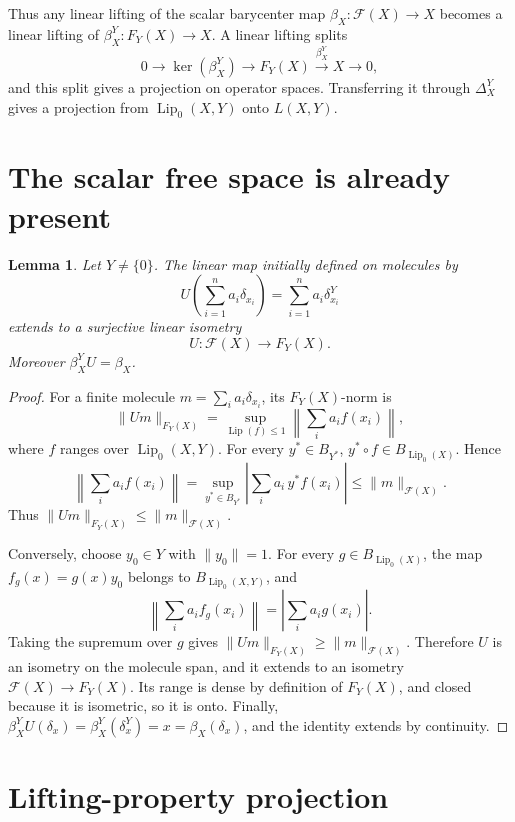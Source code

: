 \documentclass[11pt]{article}
\newtheorem{lemma}{Lemma}
\DeclareMathOperator{\Lip}{Lip}
\begin{document}
Thus any linear lifting of the scalar barycenter map
\(\beta_X:\mathcal F(X)\to X\) becomes a linear lifting of
\(\beta_X^Y:F_Y(X)\to X\). A linear lifting splits
\[
  0\longrightarrow \ker(\beta_X^Y)\longrightarrow F_Y(X)
  \stackrel{\beta_X^Y}{\longrightarrow} X\longrightarrow 0,
\]
and this split gives a projection on operator spaces. Transferring it through
\(\Delta_X^Y\) gives a projection from \(\Lip_0(X,Y)\) onto \(L(X,Y)\).

\section*{The scalar free space is already present}

\begin{lemma}
Let \(Y\neq\{0\}\). The linear map initially defined on molecules by
\[
  U\left(\sum_{i=1}^n a_i\delta_{x_i}\right)
  =
  \sum_{i=1}^n a_i\delta_{x_i}^Y
\]
extends to a surjective linear isometry
\[
  U:\mathcal F(X)\longrightarrow F_Y(X).
\]
Moreover \(\beta_X^Y U=\beta_X\).
\end{lemma}

\begin{proof}
For a finite molecule \(m=\sum_i a_i\delta_{x_i}\), its \(F_Y(X)\)-norm is
\[
  \|Um\|_{F_Y(X)}
  =
  \sup_{\Lip(f)\leq 1}
  \left\|\sum_i a_i f(x_i)\right\|,
\]
where \(f\) ranges over \(\Lip_0(X,Y)\). For every \(y^*\in B_{Y^*}\),
\(y^*\circ f\in B_{\Lip_0(X)}\). Hence
\[
  \left\|\sum_i a_i f(x_i)\right\|
  =
  \sup_{y^*\in B_{Y^*}}
  \left|\sum_i a_i\,y^*f(x_i)\right|
  \leq \|m\|_{\mathcal F(X)}.
\]
Thus \(\|Um\|_{F_Y(X)}\leq \|m\|_{\mathcal F(X)}\).

Conversely, choose \(y_0\in Y\) with \(\|y_0\|=1\). For every
\(g\in B_{\Lip_0(X)}\), the map \(f_g(x)=g(x)y_0\) belongs to
\(B_{\Lip_0(X,Y)}\), and
\[
  \left\|\sum_i a_i f_g(x_i)\right\|
  =
  \left|\sum_i a_i g(x_i)\right|.
\]
Taking the supremum over \(g\) gives
\(\|Um\|_{F_Y(X)}\geq \|m\|_{\mathcal F(X)}\). Therefore \(U\) is an
isometry on the molecule span, and it extends to an isometry
\(\mathcal F(X)\to F_Y(X)\). Its range is dense by definition of \(F_Y(X)\),
and closed because it is isometric, so it is onto. Finally,
\(\beta_X^Y U(\delta_x)=\beta_X^Y(\delta_x^Y)=x=\beta_X(\delta_x)\), and
the identity extends by continuity.
\end{proof}

\section*{Lifting-property projection}
\end{document}
